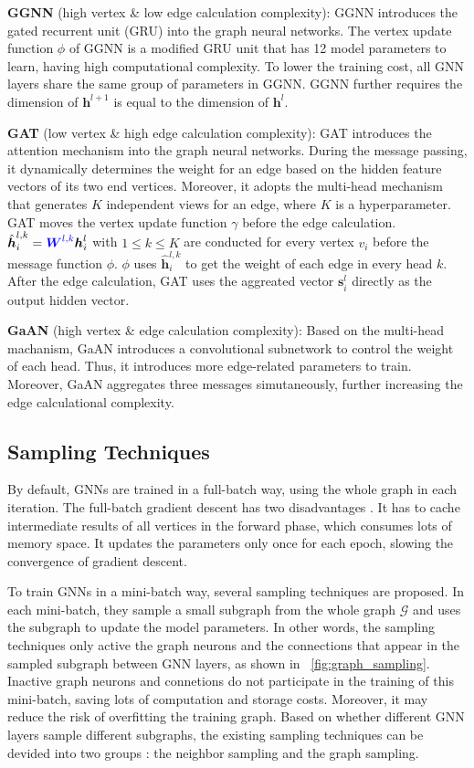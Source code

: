 \textbf{GGNN} (high vertex \& low edge calculation complexity):
GGNN introduces the gated recurrent unit (GRU) into the graph neural networks.
The vertex update function $\phi$ of GGNN is a modified GRU unit that has 12 model parameters to learn, having high computational complexity.
To lower the training cost, all GNN layers share the same group of parameters in GGNN.
GGNN further requires the dimension of $\boldsymbol{h}^{l+1}$ is equal to the dimension of $\boldsymbol{h}^l$.

\textbf{GAT} (low vertex \& high edge calculation complexity):
GAT introduces the attention mechanism into the graph neural networks.
During the message passing, it dynamically determines the weight for an edge based on the hidden feature vectors of its two end vertices.
Moreover, it adopts the multi-head mechanism that generates $K$ independent views for an edge, where $K$ is a hyperparameter.
GAT moves the vertex update function $\gamma$ before the edge calculation.
$\hat{\boldsymbol{h}}^{l,k}_{i} = \textcolor{blue}{\boldsymbol{W}^{l,k}} \boldsymbol{h}_i^{l}$ with $1 \leq k \leq K$ are conducted for every vertex $v_i$ before the message function $\phi$.
$\phi$ uses $\hat{\boldsymbol{h}}^{l,k}_{i}$ to get the weight of each edge in every head $k$.
After the edge calculation, GAT uses the aggreated vector $\boldsymbol{s}^l_i$ directly as the output hidden vector.

\textbf{GaAN} (high vertex \& edge calculation complexity):
Based on the multi-head machanism, GaAN introduces a convolutional subnetwork to control the weight of each head.
Thus, it introduces more edge-related parameters to train.
Moreover, GaAN aggregates three messages simutaneously, further increasing the edge calculational complexity.

\subsection{Sampling Techniques}

By default, GNNs are trained in a full-batch way, using the whole graph in each iteration.
The full-batch gradient descent has two disadvantages \cite{chiang2019_cluster_gcn}.
It has to cache intermediate results of all vertices in the forward phase, which consumes lots of memory space.
It updates the parameters only once for each epoch, slowing the convergence of gradient descent.

To train GNNs in a mini-batch way, several sampling techniques \cite{chiang2019_cluster_gcn} are proposed.
In each mini-batch, they sample a small subgraph from the whole graph $\mathcal{G}$ and uses the subgraph to update the model parameters.
In other words, the sampling techniques only active the graph neurons and the connections that appear in the sampled subgraph between GNN layers, as shown in \figurename~\ref{fig:graph_sampling}.
Inactive graph neurons and connetions do not participate in the training of this mini-batch, saving lots of computation and storage costs.
Moreover, it may reduce the risk of overfitting the training graph.
Based on whether different GNN layers sample different subgraphs, the existing sampling techniques can be devided into two groups \cite{zeng2020_graphsaint}: the neighbor sampling and the graph sampling.

